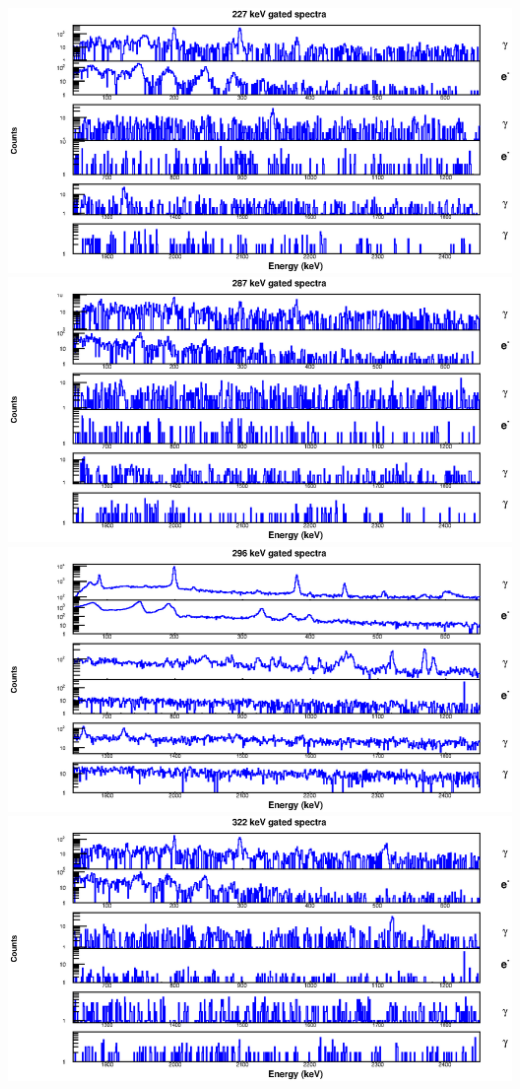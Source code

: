 \begin{landscape}
\includegraphics[scale=1.2]{156Gd_Appendix/227_combined.eps}
\includegraphics[scale=1.2]{156Gd_Appendix/287_combined.eps}
\includegraphics[scale=1.2]{156Gd_Appendix/296_combined.eps}
\includegraphics[scale=1.2]{156Gd_Appendix/322_combined.eps}

\end{landscape}
